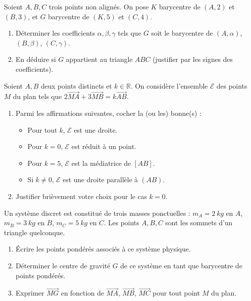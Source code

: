 \documentclass[11pt]{article}
\begin{document}
\begin{exercice}
Soient $A, B, C$ trois points non alignés. On pose $K$ barycentre de $(A,2)$ et $(B,3)$, et $G$ barycentre de $(K,5)$ et $(C,4)$.
\begin{enumerate}
    \item Déterminer les coefficients $\alpha, \beta, \gamma$ tels que $G$ soit le barycentre de $(A,\alpha)$, $(B,\beta)$, $(C,\gamma)$.
    \item En déduire si $G$ appartient au triangle $ABC$ (justifier par les signes des coefficients).
\end{enumerate}
\end{exercice}

\begin{exercice}
Soient $A, B$ deux points distincts et $k \in \mathbb{R}$. On considère l'ensemble $\mathcal{E}$ des points $M$ du plan tels que $2\overrightarrow{MA} + 3\overrightarrow{MB} = k \overrightarrow{AB}$.
\begin{enumerate}
    \item Parmi les affirmations suivantes, cocher la (ou les) bonne(s) :
\begin{itemize}
        \item[$\square$] Pour tout $k$, $\mathcal{E}$ est une droite.
        \item[$\square$] Pour $k=0$, $\mathcal{E}$ est réduit à un point.
        \item[$\square$] Pour $k=5$, $\mathcal{E}$ est la médiatrice de $[AB]$.
        \item[$\square$] Si $k \neq 0$, $\mathcal{E}$ est une droite parallèle à $(AB)$.
    \end{itemize}
    \item Justifier brièvement votre choix pour le cas $k=0$.
\end{enumerate}
\end{exercice}

\begin{exercice}
Un système discret est constitué de trois masses ponctuelles : $m_A = \SI{2}{kg}$ en $A$, $m_B = \SI{3}{kg}$ en $B$, $m_C = \SI{5}{kg}$ en $C$. Les points $A, B, C$ sont les sommets d'un triangle quelconque.
\begin{enumerate}
    \item Écrire les points pondérés associés à ce système physique.
    \item Déterminer le centre de gravité $G$ de ce système en tant que barycentre de points pondérés.
    \item Exprimer $\overrightarrow{MG}$ en fonction de $\overrightarrow{MA}$, $\overrightarrow{MB}$, $\overrightarrow{MC}$ pour tout point $M$ du plan.
\end{enumerate}
\end{exercice}
\end{document}
